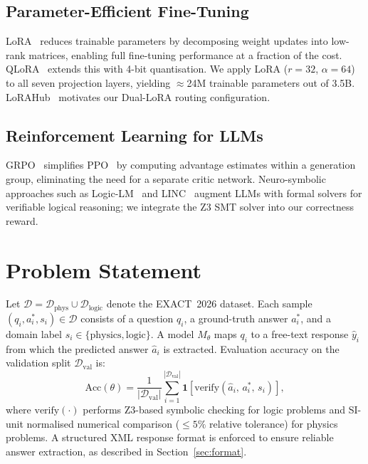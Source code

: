 \documentclass{ieeeaccess}
\newcommand{\dataset}{EXACT~2026}
\begin{document}
\subsection{Parameter-Efficient Fine-Tuning}

LoRA~\cite{Hu2022} reduces trainable parameters by decomposing weight
updates into low-rank matrices, enabling full fine-tuning performance
at a fraction of the cost.
QLoRA~\cite{Dettmers2023} extends this with 4-bit quantisation.
We apply LoRA ($r=32$, $\alpha=64$) to all seven projection layers,
yielding $\approx$24M trainable parameters out of 3.5B.
LoRAHub~\cite{Huang2023} motivates our Dual-LoRA routing configuration.

\subsection{Reinforcement Learning for LLMs}

GRPO~\cite{Shao2024} simplifies PPO~\cite{Schulman2017} by computing
advantage estimates within a generation group, eliminating the need
for a separate critic network.
Neuro-symbolic approaches such as Logic-LM~\cite{Pan2023} and
LINC~\cite{Olausson2023} augment LLMs with formal solvers for
verifiable logical reasoning; we integrate the Z3 SMT solver
into our correctness reward.

\section{Problem Statement}
\label{sec:problem}

Let $\mathcal{D} = \mathcal{D}_\text{phys} \cup \mathcal{D}_\text{logic}$
denote the \dataset{} dataset.
Each sample $(q_i, a_i^*, s_i) \in \mathcal{D}$ consists of a question
$q_i$, a ground-truth answer $a_i^*$, and a domain label
$s_i \in \{\text{physics},\text{logic}\}$.
A model $M_\theta$ maps $q_i$ to a free-text response $\hat{y}_i$ from
which the predicted answer $\hat{a}_i$ is extracted.
Evaluation accuracy on the validation split $\mathcal{D}_\text{val}$ is:
\begin{equation}
  \mathrm{Acc}(\theta)
    = \frac{1}{|\mathcal{D}_\text{val}|}\sum_{i=1}^{|\mathcal{D}_\text{val}|}
      \mathbf{1}\!\left[\mathrm{verify}\!\left(
        \hat{a}_i,\, a_i^*,\, s_i\right)\right],
  \label{eq:acc}
\end{equation}
where $\mathrm{verify}(\cdot)$ performs Z3-based symbolic checking for
logic problems and SI-unit normalised numerical comparison
($\leq 5\%$ relative tolerance) for physics problems.
A structured XML response format is enforced to ensure reliable answer
extraction, as described in Section~\ref{sec:format}.
\end{document}
